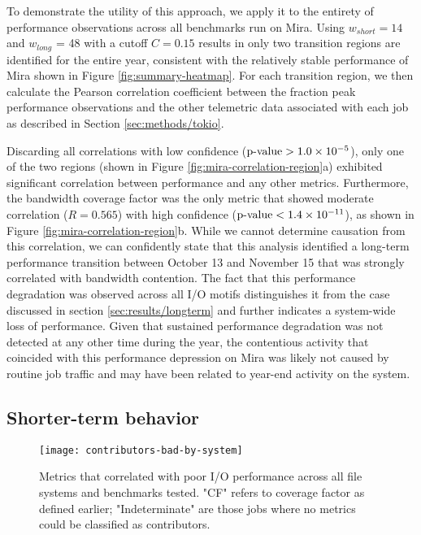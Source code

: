 To demonstrate the utility of this approach, we apply it to the entirety of performance observations across all benchmarks run on Mira.
Using $w_{short} = 14$ and $w_{long}$ = 48 with a cutoff $C = 0.15$ results in only two transition regions are identified for the entire year, consistent with the relatively stable performance of Mira shown in Figure \ref{fig:summary-heatmap}.
For each transition region, we then calculate the Pearson correlation coefficient between the fraction peak performance observations and the other telemetric data associated with each job as described in Section \ref{sec:methods/tokio}.

Discarding all correlations with low confidence ($\textup{p-value} > {1.0 \times 10^{-5}}$), only one of the two regions (shown in Figure \ref{fig:mira-correlation-region}a) exhibited significant correlation between performance and any other metrics.
Furthermore, the bandwidth coverage factor was the only metric that showed moderate correlation (${R = 0.565}$) with high confidence ($\textup{p-value} < 1.4 \times 10^{-11}$), as shown in Figure \ref{fig:mira-correlation-region}b.
While we cannot determine causation from this correlation, we can confidently state that this analysis identified a long-term performance transition between October 13 and November 15 that was strongly correlated with bandwidth contention.
The fact that this performance degradation was observed across all I/O motifs distinguishes it from the case discussed in section \ref{sec:results/longterm} and further indicates a system-wide loss of performance.
Given that sustained performance degradation was not detected at any other time during the year, the contentious activity that coincided with this performance depression on Mira was likely not caused by routine job traffic and may have been related to year-end activity on the system.







\subsection{Shorter-term behavior} \label{sec:results/shortterm}

\begin{figure}[t]
    \centering
    \texttt{[image: contributors-bad-by-system]}
    \vspace{-.35in}
    \caption{Metrics that correlated with poor I/O performance across all file systems and benchmarks tested.  "CF" refers to coverage factor as defined earlier; "Indeterminate" are those jobs where no metrics could be classified as contributors.
    }
    \label{fig:contributors-bad-by-system}
\end{figure}

